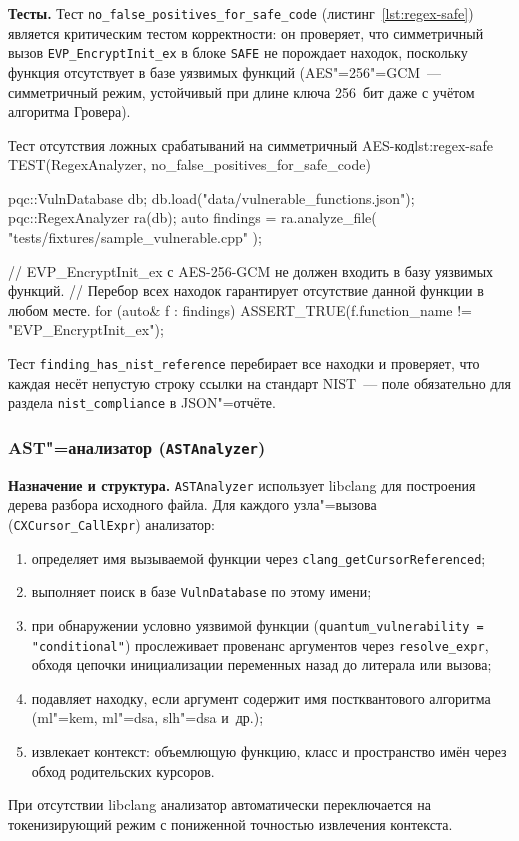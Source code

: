 \textbf{Тесты.}
Тест \texttt{no\_false\_positives\_for\_safe\_code}
(листинг~\ref{lst:regex-safe}) является критическим тестом
корректности: он проверяет, что симметричный вызов
\texttt{EVP\_EncryptInit\_ex} в блоке \texttt{SAFE} не порождает
находок, поскольку функция отсутствует в базе уязвимых функций
(AES"=256"=GCM~--- симметричный режим, устойчивый при длине ключа
256~бит даже с учётом алгоритма Гровера).

\begin{itmolisting}[C++]{Тест отсутствия ложных срабатываний на симметричный AES-код}{lst:regex-safe}
TEST(RegexAnalyzer, no_false_positives_for_safe_code) {
    pqc::VulnDatabase db;
    db.load("data/vulnerable_functions.json");
    pqc::RegexAnalyzer ra(db);
    auto findings = ra.analyze_file(
        "tests/fixtures/sample_vulnerable.cpp"
    );

    // EVP_EncryptInit_ex с AES-256-GCM не должен входить в базу уязвимых функций.
    // Перебор всех находок гарантирует отсутствие данной функции в любом месте.
    for (auto& f : findings)
        ASSERT_TRUE(f.function_name != "EVP_EncryptInit_ex");
}
\end{itmolisting}

Тест \texttt{finding\_has\_nist\_reference} перебирает все находки
и проверяет, что каждая несёт непустую строку ссылки на стандарт
NIST~--- поле обязательно для раздела \texttt{nist\_compliance} в
JSON"=отчёте.

\subsubsection{AST"=анализатор (\texttt{ASTAnalyzer})}

\textbf{Назначение и структура.}
\texttt{ASTAnalyzer} использует libclang для построения
дерева разбора исходного файла.
Для каждого узла"=вызова (\texttt{CXCursor\_CallExpr}) анализатор:
\begin{enumerate}
  \item определяет имя вызываемой функции через
        \texttt{clang\_getCursorReferenced};
  \item выполняет поиск в базе \texttt{VulnDatabase} по этому имени;
  \item при обнаружении условно уязвимой функции
        (\texttt{quantum\_vulnerability = "conditional"}) прослеживает
        провенанс аргументов через \texttt{resolve\_expr}, обходя
        цепочки инициализации переменных назад до литерала или вызова;
  \item подавляет находку, если аргумент содержит имя постквантового
        алгоритма (ml"=kem, ml"=dsa, slh"=dsa и~др.);
  \item извлекает контекст: объемлющую функцию, класс и пространство
        имён через обход родительских курсоров.
\end{enumerate}
При отсутствии libclang анализатор автоматически переключается на
токенизирующий режим с пониженной точностью извлечения контекста.

